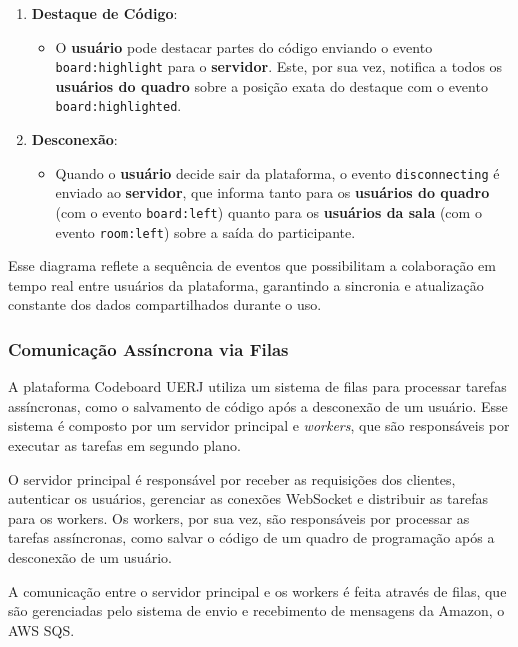 \begin{enumerate}
    \item \textbf{Destaque de Código}:
    \begin{itemize}
        \item O \textbf{usuário} pode destacar partes do código enviando o evento \texttt{board:highlight} para o \textbf{servidor}. Este, por sua vez, notifica a todos os \textbf{usuários do quadro} sobre a posição exata do destaque com o evento \texttt{board:highlighted}.
    \end{itemize}

    \item \textbf{Desconexão}:
    \begin{itemize}
        \item Quando o \textbf{usuário} decide sair da plataforma, o evento \texttt{disconnecting} é enviado ao \textbf{servidor}, que informa tanto para os \textbf{usuários do quadro} (com o evento \texttt{board:left}) quanto para os \textbf{usuários da sala} (com o evento \texttt{room:left}) sobre a saída do participante.
    \end{itemize}
\end{enumerate}

Esse diagrama reflete a sequência de eventos que possibilitam a colaboração em tempo real entre usuários da plataforma, garantindo a sincronia e atualização constante dos dados compartilhados durante o uso.


\subsubsection{Comunicação Assíncrona via Filas}

A plataforma Codeboard UERJ utiliza um sistema de filas para processar tarefas assíncronas, como o salvamento de código após a desconexão de um usuário. Esse sistema é composto por um servidor principal e \emph{workers}, que são responsáveis por executar as tarefas em segundo plano.

O servidor principal é responsável por receber as requisições dos clientes, autenticar os usuários, gerenciar as conexões WebSocket e distribuir as tarefas para os workers. Os workers, por sua vez, são responsáveis por processar as tarefas assíncronas, como salvar o código de um quadro de programação após a desconexão de um usuário.

A comunicação entre o servidor principal e os workers é feita através de filas, que são gerenciadas pelo sistema de envio e recebimento de mensagens da Amazon, o AWS SQS. 

